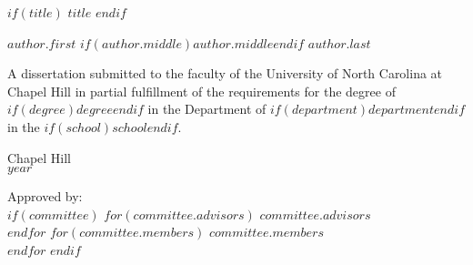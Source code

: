 \documentclass[$if(fontsize)$$fontsize$,$endif$,letterpaper,twoside]{report}
\begin{document}

\begin{titlepage}
\begin{center}


\vspace{2in}
\begin{singlespace}
$if(title)$
$title$
$endif$
\end{singlespace}


\vspace{61pt} %
$author.first$ $if(author.middle)$$author.middle$$endif$ $author.last$
\end{center}

\vspace{50pt}
\begin{singlespace}
\begin{center}
\noindent 
A dissertation submitted to the faculty of the University of North Carolina at Chapel Hill in partial fulfillment of the requirements for the degree of $if(degree)$$degree$$endif$ in the Department of $if(department)$$department$$endif$ in the $if(school)$$school$$endif$.
\end{center}
\end{singlespace}


\vspace{50pt}
\begin{center}
\begin{singlespace} 
Chapel Hill\\
$year$
\end{singlespace}
\end{center}

 

\vfill
\begin{flushright}
\begin{minipage}[t]{1.5in} 
Approved by:\\
$if(committee)$ 
$for(committee.advisors)$ $committee.advisors$ \\ $endfor$
$for(committee.members)$ $committee.members$ \\ $endfor$
$endif$
\end{minipage}
\end{flushright}

\end{titlepage}
\end{document}
